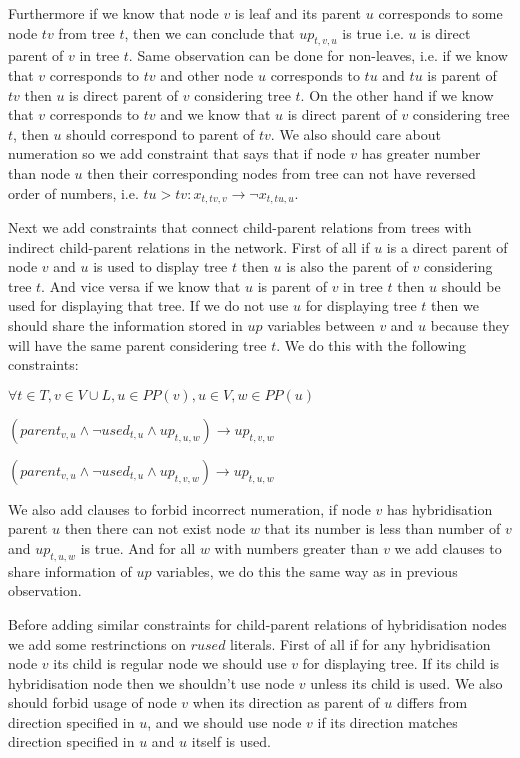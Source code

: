 \documentclass[runningheads, envcountsame, a4paper]{llncs}
\begin{document}
Furthermore if we know that node $v$ is leaf and its parent $u$ corresponds to some node $tv$ from tree $t$, 
then we can conclude that $up_{t,v,u}$ is true i.e. $u$ is direct parent of $v$ in tree $t$. Same observation 
can be done for non-leaves, i.e. if we know that $v$ corresponds to $tv$ and other node $u$ corresponds to $tu$ 
and $tu$ is parent of $tv$ then $u$ is direct parent of $v$ considering tree $t$. On the other hand if we know 
that $v$ corresponds to $tv$ and we know that $u$ is direct parent of $v$ considering tree $t$, then $u$ should 
correspond to parent of $tv$. We also should care about numeration so we add constraint that says that if node 
$v$ has greater number than node $u$ then their corresponding nodes from tree can not have reversed order of 
numbers, i.e. $tu > tv : x_{t,tv,v} \rightarrow \neg x_{t,tu,u}$.

Next we add constraints that connect child-parent relations from trees with indirect child-parent relations in 
the network. First of all if $u$ is a direct parent of node $v$ and $u$ is used to display tree $t$ then $u$ is 
also the parent of $v$ considering tree $t$. And vice versa if we know that $u$ is parent of $v$ in tree $t$ then 
$u$ should be used for displaying that tree. If we do not use $u$ for displaying tree $t$ then we should share the 
information stored in $up$ variables between $v$ and $u$ because they will have the same parent considering tree $t$. 
We do this with the following constraints:

$\forall t \in T,v \in V \cup L, u \in PP(v), u \in V, w \in PP(u)$

$(parent_{v,u} \wedge \neg used_{t,u} \wedge up_{t,u,w}) \rightarrow up_{t,v,w}$

$(parent_{v,u} \wedge \neg used_{t,u} \wedge up_{t,v,w}) \rightarrow up_{t,u,w}$

We also add clauses to forbid incorrect numeration, if node $v$ has hybridisation parent $u$ then there can not 
exist node $w$ that its number is less than number of $v$ and $up_{t,u,w}$ is true. And for all $w$ with numbers 
greater than $v$ we add clauses to share information of $up$ variables, we do this the same way as in previous observation.

Before adding similar constraints for child-parent relations of hybridisation nodes we add some restrinctions on
$rused$ literals. First of all if for any hybridisation node $v$ its child is regular node we should use $v$ for 
displaying tree. If its child is hybridisation node then we shouldn't use node $v$ unless its child is used. We 
also should forbid usage of node $v$ when its direction as parent of $u$ differs from direction specified in 
$u$, and we should use node $v$ if its direction matches direction specified in $u$ and $u$ itself is used.
\end{document}
